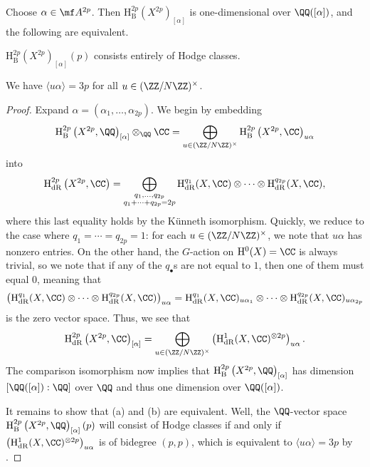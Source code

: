 \documentclass[../thesis.tex]{subfiles}
\begin{document}
\begin{proposition} \label{prop:find-hodge-classes}
	Choose $\alpha\in\mf A^{2p}$. Then $\mathrm H_{\mathrm B}^{2p}\left(X^{2p}\right)_{[\alpha]}$ is one-dimensional over $\QQ([\alpha])$, and the following are equivalent.
	\begin{listalph}
		\item $\mathrm H_{\mathrm B}^{2p}\left(X^{2p}\right)_{[\alpha]}(p)$ consists entirely of Hodge classes.
		\item We have $\langle u\alpha\rangle=3p$ for all $u\in(\ZZ/N\ZZ)^\times$.
	\end{listalph}
\end{proposition}
\begin{proof}
	Expand $\alpha=(\alpha_1,\ldots,\alpha_{2p})$. We begin by embedding
	\[\mathrm H_{\mathrm B}^{2p}\left(X^{2p},\QQ\right)_{[\alpha]}\otimes_\QQ\CC=\bigoplus_{u\in(\ZZ/N\ZZ)^\times}\mathrm H_{\mathrm B}^{2p}\left(X^{2p},\CC\right)_{u\alpha}\]
	into
	\[\mathrm H_{\mathrm{dR}}^{2p}\left(X^{2p},\CC\right)=\bigoplus_{\substack{q_1,\ldots,q_{2p}\\q_1+\cdots+q_{2p}=2p}}\mathrm H_{\mathrm{dR}}^{q_1}(X,\CC)\otimes\cdots\otimes\mathrm H_{\mathrm{dR}}^{q_{2p}}(X,\CC),\]
	where this last equality holds by the K\"unneth isomorphism. Quickly, we reduce to the case where $q_1=\cdots=q_{2p}=1$: for each $u\in(\ZZ/N\ZZ)^\times$, we note that $u\alpha$ has nonzero entries. On the other hand, the $G$-action on $\mathrm H^0(X)=\CC$ is always trivial, so we note that if any of the $q_\bullet$s are not equal to $1$, then one of them must equal $0$, meaning that
	\[\left(\mathrm H_{\mathrm{dR}}^{q_1}(X,\CC)\otimes\cdots\otimes\mathrm H_{\mathrm{dR}}^{q_{2p}}(X,\CC)\right)_{u\alpha}=\mathrm H_{\mathrm{dR}}^{q_1}(X,\CC)_{u\alpha_1}\otimes\cdots\otimes\mathrm H_{\mathrm{dR}}^{q_{2p}}(X,\CC)_{u\alpha_{2p}}\]
	is the zero vector space. Thus, we see that
	\[\mathrm H^{2p}_{\mathrm{dR}}\left(X^{2p},\CC\right)_{[\alpha]}=\bigoplus_{u\in(\ZZ/N\ZZ)^\times}\left(\mathrm H^1_{\mathrm{dR}}(X,\CC)^{\otimes2p}\right)_{u\alpha}.\]
	The comparison isomorphism now implies that $\mathrm H_{\mathrm B}^{2p}\left(X^{2p},\QQ\right)_{[\alpha]}$ has dimension $[\QQ([\alpha]):\QQ]$ over $\QQ$ and thus one dimension over $\QQ([\alpha])$.
	
	It remains to show that (a) and (b) are equivalent. Well, the $\QQ$-vector space $\mathrm H_{\mathrm B}^{2p}\left(X^{2p},\QQ\right)_{[\alpha]}(p)$ will consist of Hodge classes if and only if $\left(\mathrm H^1_{\mathrm{dR}}(X,\CC)^{\otimes2p}\right)_{u\alpha}$ is of bidegree $(p,p)$, which is equivalent to $\langle u\alpha\rangle=3p$ by .
\end{proof}
\end{document}

